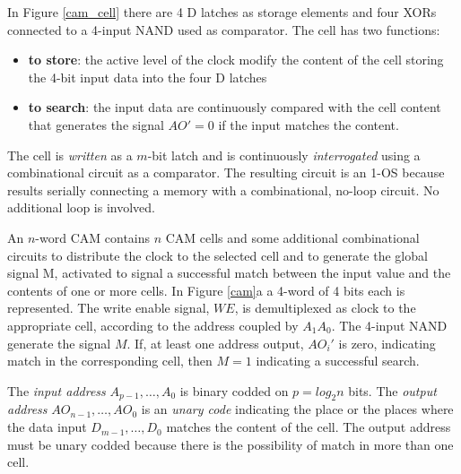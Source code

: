In Figure \ref{cam_cell} there are 4 D latches as storage elements
and four XORs connected to a 4-input NAND used as comparator. The
cell has two functions:

\begin{itemize}
    \item {\bf to store}: the active level of the clock modify the content
    of the cell storing  the 4-bit input data into the four D
    latches
    \item {\bf to search}: the input data are continuously compared
    with the cell content that generates the signal $AO'=0$ if
    the input matches the content.
\end{itemize}





The cell is {\em written} as a $m$-bit latch and is continuously
{\em interrogated} using a combinational circuit as a comparator.
The resulting circuit is an 1-OS because  results serially
connecting a memory with a combinational,
no-loop circuit. No additional loop is involved.

An $n$-word CAM contains $n$ CAM cells and some additional
combinational circuits to distribute the clock to the selected
cell and to generate the global signal M, activated to
signal a successful match between the input value and the contents of one or
more cells. In Figure \ref{cam}a a 4-word of 4 bits each
is represented. The write enable signal, $WE$, is demultiplexed as
clock to the appropriate cell, according to the address coupled by
$A_{1}A_{0}$. The 4-input NAND generate the signal $M$. If, at
least one address output, $AO_{i}'$ is zero, indicating match in
the corresponding cell, then $M = 1$ indicating a successful
search.


The {\em input address} $A_{p-1}, \ldots, A_{0}$ is binary codded
on $p = log_{2} n$ bits. The {\em output address} $AO_{n-1},
\ldots, AO_{0}$ is an {\em unary code} indicating the place or the
places where the data input $D_{m-1}, \ldots, D_{0}$ matches the
content of the cell. The output address must be unary codded
because there is the possibility of match in more than one cell.

